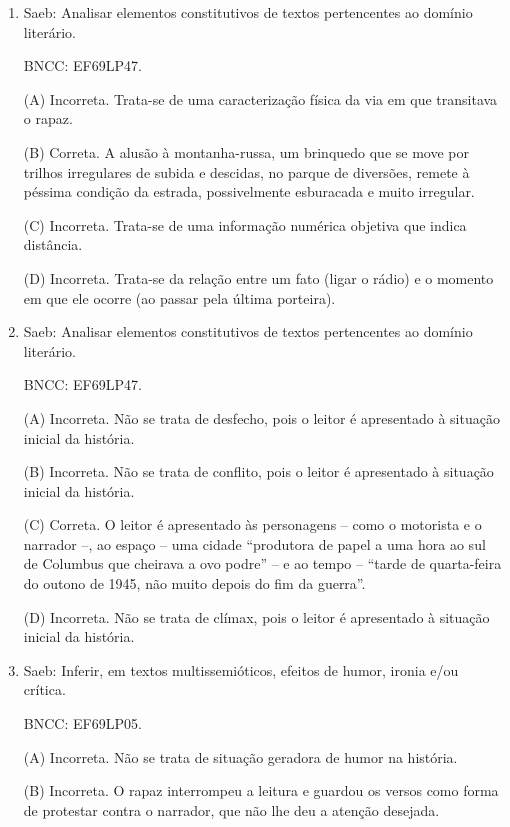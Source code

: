 \begin{enumerate}
(D) Incorreta. O texto da campanha apresenta um jogo entre os sentidos
figurado e literal, como na expressão ``mostre a língua''.


\item

Saeb: Analisar elementos constitutivos de textos pertencentes ao domínio
literário.

BNCC: EF69LP47.

(A) Incorreta. Trata-se de uma caracterização física da via em que
transitava o rapaz.

(B) Correta. A alusão à montanha-russa, um brinquedo que se move por
trilhos irregulares de subida e descidas, no parque de diversões, remete
à péssima condição da estrada, possivelmente esburacada e muito
irregular.

(C) Incorreta. Trata-se de uma informação numérica objetiva que indica
distância.

(D) Incorreta. Trata-se da relação entre um fato (ligar o rádio) e o momento em que ele ocorre (ao passar pela última porteira).


\item

Saeb: Analisar elementos constitutivos de textos pertencentes ao domínio
literário.

BNCC: EF69LP47.

(A) Incorreta. Não se trata de desfecho, pois o leitor é apresentado à
situação inicial da história.

(B) Incorreta. Não se trata de conflito, pois o leitor é apresentado à
situação inicial da história.

(C) Correta. O leitor é apresentado às personagens -- como o motorista e
o narrador --, ao espaço -- uma cidade ``produtora de papel a uma hora
ao sul de Columbus que cheirava a ovo podre'' -- e ao tempo -- ``tarde
de quarta-feira do outono de 1945, não muito depois do fim da guerra''.

(D) Incorreta. Não se trata de clímax, pois o leitor é apresentado à
situação inicial da história.


\item

Saeb: Inferir, em textos multissemióticos, efeitos de humor, ironia e/ou
crítica.

BNCC: EF69LP05.

(A) Incorreta. Não se trata de situação geradora de humor na história.

(B) Incorreta. O rapaz interrompeu a leitura e guardou os versos como
forma de protestar contra o narrador, que não lhe deu a atenção
desejada.


\end{enumerate}
